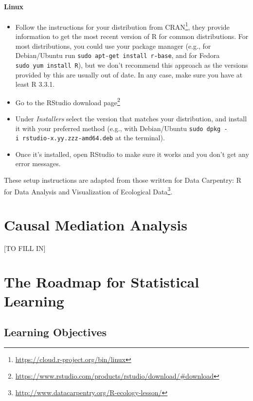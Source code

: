 \documentclass[
  12pt, krantz2,
]{book}
\providecommand{\tightlist}{%
  \setlength{\itemsep}{0pt}\setlength{\parskip}{0pt}}
\renewcommand{\href}[2]{#2\footnote{\url{#1}}}
\theoremstyle{definition}
\theoremstyle{definition}
\theoremstyle{definition}
\newcommand{\1}{\mathbbm{1}}
\begin{document}
\hypertarget{linux}{%
\subsubsection{Linux}\label{linux}}

\begin{itemize}
\tightlist
\item
  Follow the instructions for your distribution
  from \href{https://cloud.r-project.org/bin/linux}{CRAN}, they provide information
  to get the most recent version of R for common distributions. For most
  distributions, you could use your package manager (e.g., for Debian/Ubuntu run
  \texttt{sudo\ apt-get\ install\ r-base}, and for Fedora \texttt{sudo\ yum\ install\ R}), but we
  don't recommend this approach as the versions provided by this are
  usually out of date. In any case, make sure you have at least R 3.3.1.
\item
  Go to the \href{https://www.rstudio.com/products/rstudio/download/\#download}{RStudio download
  page}
\item
  Under \emph{Installers} select the version that matches your distribution, and
  install it with your preferred method (e.g., with Debian/Ubuntu \texttt{sudo\ dpkg\ -i\ rstudio-x.yy.zzz-amd64.deb} at the terminal).
\item
  Once it's installed, open RStudio to make sure it works and you don't get any
  error messages.
\end{itemize}

These setup instructions are adapted from those written for \href{http://www.datacarpentry.org/R-ecology-lesson/}{Data Carpentry: R
for Data Analysis and Visualization of Ecological
Data}.

\hypertarget{mediation}{%
\chapter{Causal Mediation Analysis}\label{mediation}}

{[}TO FILL IN{]}

\hypertarget{intro}{%
\chapter{The Roadmap for Statistical Learning}\label{intro}}

\hypertarget{learning-objectives}{%
\section*{Learning Objectives}\label{learning-objectives}}
\end{document}

